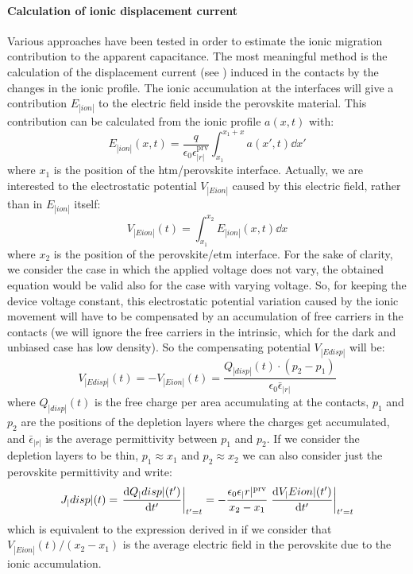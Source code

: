 	\paragraph{Calculation of ionic displacement current}\label{displacement_current_ionic}
	Various approaches have been tested in order to estimate the ionic migration contribution to the apparent capacitance.
	The most meaningful method is the calculation of the displacement current (see ) induced in the contacts by the changes in the ionic profile.
	The ionic accumulation at the interfaces will give a contribution $E_|ion|$ to the electric field inside the perovskite material.
	This contribution can be calculated from the ionic profile $a(x,t)$ with:
	\begin{equation}
		E_|ion|(x,t) = \frac{q}{\epsilon_0 \epsilon_|r|^{\mathrm{prv}}} \int_{x_1}^{x_1 + x} a(x',t) \dd x'
	\end{equation}
	where $x_1$ is the position of the \gls{htm}\-/perovskite interface.
	Actually, we are interested to the electrostatic potential $V_|Eion|$ caused by this electric field, rather than in $E_|ion|$ itself:
	\begin{equation}
		V_|Eion|(t) = \int_{x_1}^{x_2} E_|ion|(x,t) \dd x
	\end{equation}
	where $x_2$ is the position of the perovskite\-/\gls{etm} interface.
	For the sake of clarity, we consider the case in which the applied voltage does not vary, the obtained equation would be valid also for the case with varying voltage.
	So, for keeping the device voltage constant, this electrostatic potential variation caused by the ionic movement will have to be compensated by an accumulation of free carriers in the contacts (we will ignore the free carriers in the intrinsic, which for the dark and unbiased case has low density).
	So the compensating potential $V_|Edisp|$ will be:
	\begin{equation}
		V_|Edisp|(t) = -V_|Eion|(t) = \frac{Q_|disp|(t) \cdot (p_2-p_1)}{\epsilon_0 \bar\epsilon_|r|}
	\end{equation}
	where $Q_|disp|(t)$ is the free charge per area accumulating at the contacts, $p_1$ and $p_2$ are the positions of the depletion layers where the charges get accumulated, and $\bar\epsilon_|r|$ is the average permittivity between $p_1$ and $p_2$.
	If we consider the depletion layers to be thin, $p_1 \approx x_1$ and $p_2 \approx x_2$ we can also consider just the perovskite permittivity and write:
	\begin{equation}
		J_|disp|(t) = \eval{\dv{Q_|disp|(t')}{t'}}_{t'=t} = -\frac{\epsilon_0 \epsilon_|r|^{\mathrm{prv}}}{x_2-x_1} \eval{\dv{V_|Eion|(t')}{t'}}_{t'=t}
	\end{equation}
	which is equivalent to the expression derived in  if we consider that $V_|Eion|(t)/(x_2-x_1)$ is the average electric field in the perovskite due to the ionic accumulation.

